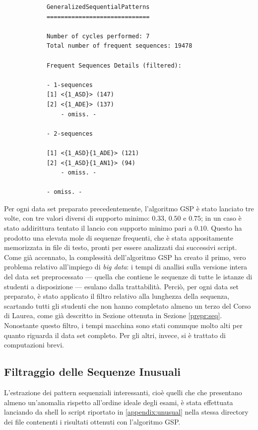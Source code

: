         \begin{lstlisting}
            GeneralizedSequentialPatterns
            =============================

            Number of cycles performed: 7
            Total number of frequent sequences: 19478

            Frequent Sequences Details (filtered):
            
            - 1-sequences
            [1] <{1_ASD}> (147)
            [2] <{1_ADE}> (137)
                - omiss. -

            - 2-sequences

            [1] <{1_ASD}{1_ADE}> (121)
            [2] <{1_ASD}{1_AN1}> (94)
                - omiss. -

            - omiss. -
        \end{lstlisting}

        Per ogni data set preparato precedentemente, l'algoritmo GSP è stato lanciato tre volte, con tre valori diversi di supporto minimo: $0.33$, $0.50$ e $0.75$; in un caso è stato addirittura tentato il lancio con supporto minimo pari a $0.10$. Questo ha prodotto una elevata mole di sequenze frequenti, che è stata appositamente memorizzata in file di testo, pronti per essere analizzati dai successivi script. \\

        Come già accennato, la complessità dell'algoritmo GSP ha creato il primo, vero problema relativo all'impiego di \textit{big data}: i tempi di anallisi sulla versione intera del data set preprocessato --- quella che contiene le sequenze di tutte le istanze di studenti a disposizione --- esulano dalla trattabilità. Perciò, per ogni data set preparato, è stato applicato il filtro relativo alla lunghezza della sequenza, scartando tutti gli studenti che non hanno completato almeno un terzo del Corso di Laurea, come già descritto in Sezione ottenuta in Sezione \ref{prepr:seq}. Nonostante questo filtro, i tempi macchina sono stati comunque molto alti per quanto riguarda il data set completo. Per gli altri, invece, si è trattato di computazioni brevi. \\

    \subsection{Filtraggio delle Sequenze Inusuali}

    L'estrazione dei pattern sequenziali interessanti, cioè quelli che che presentano almeno un'anomalia rispetto all'ordine ideale degli esami, è stata effettuata lanciando da shell lo script riportato in \ref{appendix:unusual} nella stessa directory dei file contenenti i risultati ottenuti con l'algoritmo GSP. \\

